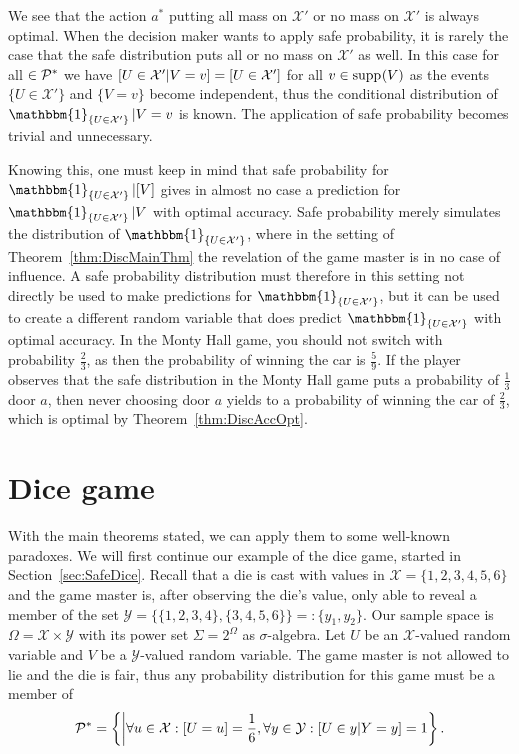 \documentclass[a4paper]{report}
\theoremstyle{plain}
\theoremstyle{definition}
\theoremstyle{remark}
\numberwithin{equation}{chapter}
\let\P\relax
\DeclareMathOperator{\P}{\mathbb{P}}
\DeclareMathOperator{\1}{\mathbbm{1}}
\newcommand{\X}{\mathcal{X}}
\newcommand{\Y}{\mathcal{Y}}
\DeclareMathOperator{\supp}{supp}
\newcommand{\Pmod}{\mathcal{P}^*}
\newcommand{\GeneralGenInd}{\1_{\{U\in\X'\}}}
\begin{document}
We see that the action $a^*$ putting all mass on $\X'$ or no mass on $\X'$ is always optimal. When the decision maker wants to apply safe probability, it is rarely the case that the safe distribution puts all or no mass on $\X'$ as well. In this case for all $\P\in\Pmod$ we have $\P[U\in\X'|V=v]=\P[U\in\X']$ for all $v\in\supp_{\P}(V)$ as the events $\{U\in\X'\}$ and $\{V=v\}$ become independent, thus the conditional distribution of $\GeneralGenInd|V=v$ is known. The application of safe probability becomes trivial and unnecessary.

Knowing this, one must keep in mind that safe probability for $\GeneralGenInd|[V]$ gives in almost no case a prediction for $\GeneralGenInd|V$ with optimal accuracy. Safe probability merely simulates the distribution of $\GeneralGenInd$, where in the setting of Theorem~\ref{thm:DiscMainThm} the revelation of the game master is in no case of influence. A safe probability distribution must therefore in this setting not directly be used to make predictions for $\GeneralGenInd$, but it can be used to create a different random variable that does predict $\GeneralGenInd$ with optimal accuracy. In the Monty Hall game, you should not switch with probability $\frac{2}{3}$, as then the probability of winning the car is $\frac{5}{9}$. If the player observes that the safe distribution in the Monty Hall game puts a probability of $\frac{1}{3}$ door $a$, then never choosing door $a$ yields to a probability of winning the car of $\frac{2}{3}$, which is optimal by Theorem~\ref{thm:DiscAccOpt}.

\section{Dice game}\label{sec:DiscDice}
With the main theorems stated, we can apply them to some well-known paradoxes. We will first continue our example of the dice game, started in Section~\ref{sec:SafeDice}. Recall that a die is cast with values in $\X=\{1,2,3,4,5,6\}$ and the game master is, after observing the die's value, only able to reveal a member of the set $\Y=\{\{1,2,3,4\},\{3,4,5,6\}\}=:\{y_1,y_2\}$. Our sample space is $\Omega=\X\times\Y$ with its power set $\Sigma=2^\Omega$ as $\sigma$-algebra. Let $U$ be an $\X$-valued random variable and $V$ be a $\Y$-valued random variable. The game master is not allowed to lie and the die is fair, thus any probability distribution for this game must be a member of \begin{equation}
\Pmod=\left\{\P\middle|\forall u\in\X:\P[U=u]=\frac{1}{6},\forall y\in\Y:\P[U\in y|Y=y]=1\right\}.
\end{equation}
\end{document}
